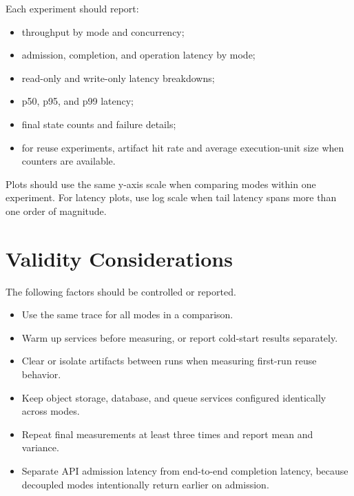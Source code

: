 \documentclass[11pt]{article}
\begin{document}
Each experiment should report:

\begin{itemize}[leftmargin=*]
  \item throughput by mode and concurrency;
  \item admission, completion, and operation latency by mode;
  \item read-only and write-only latency breakdowns;
  \item p50, p95, and p99 latency;
  \item final state counts and failure details;
  \item for reuse experiments, artifact hit rate and average execution-unit
  size when counters are available.
\end{itemize}

Plots should use the same y-axis scale when comparing modes within one
experiment.  For latency plots, use log scale when tail latency spans more than
one order of magnitude.

\section{Validity Considerations}

The following factors should be controlled or reported.

\begin{itemize}[leftmargin=*]
  \item Use the same trace for all modes in a comparison.
  \item Warm up services before measuring, or report cold-start results
  separately.
  \item Clear or isolate artifacts between runs when measuring first-run reuse
  behavior.
  \item Keep object storage, database, and queue services configured identically
  across modes.
  \item Repeat final measurements at least three times and report mean and
  variance.
  \item Separate API admission latency from end-to-end completion latency,
  because decoupled modes intentionally return earlier on admission.
\end{itemize}
\end{document}
